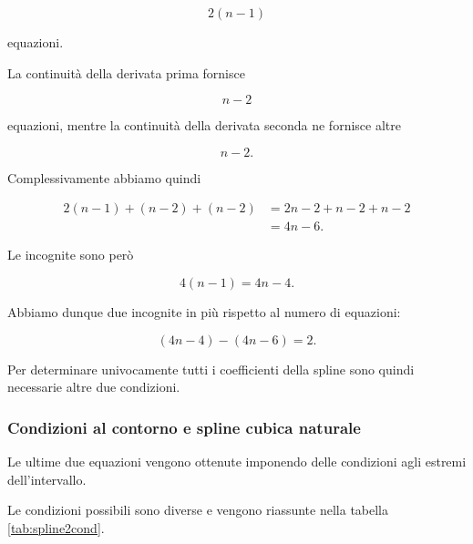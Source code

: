 \begin{equation*}
    2(n-1)
\end{equation*}

equazioni.

La continuità della derivata prima fornisce

\begin{equation*}
    n-2
\end{equation*}

equazioni, mentre la continuità della derivata seconda ne fornisce
altre

\begin{equation*}
    n-2.
\end{equation*}

Complessivamente abbiamo quindi

\begin{equation*}
\begin{split}
2(n-1)+(n-2)+(n-2)
&=2n-2+n-2+n-2\\
&=4n-6.
\end{split}
\end{equation*}

Le incognite sono però

\begin{equation*}
    4(n-1)=4n-4.
\end{equation*}

Abbiamo dunque due incognite in più rispetto al numero di equazioni:

\begin{equation*}
    (4n-4)-(4n-6)=2.
\end{equation*}

Per determinare univocamente tutti i coefficienti della spline sono
quindi necessarie altre due condizioni.


\subsubsection{Condizioni al contorno e spline cubica naturale}

Le ultime due equazioni vengono ottenute imponendo delle condizioni
agli estremi dell'intervallo.

Le condizioni possibili sono diverse e vengono riassunte nella tabella \ref{tab:spline2cond}.

